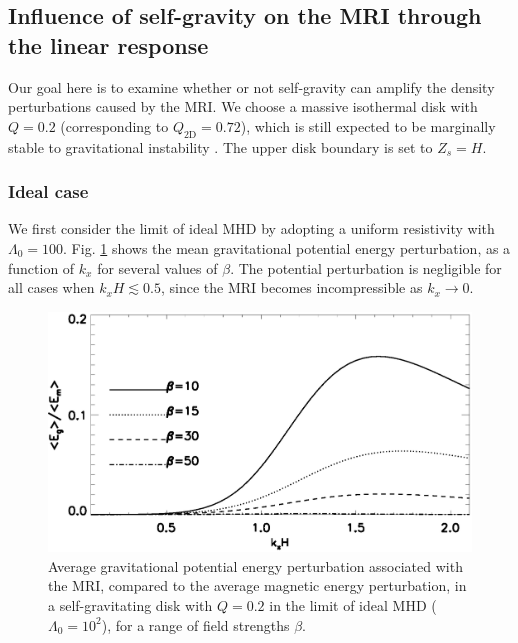 

\subsection{Influence of self-gravity on the MRI through the linear
  response}  
Our goal here is to examine whether or not self-gravity can amplify
the density perturbations caused by the MRI. We choose a massive 
isothermal disk with $Q=0.2$ (corresponding to $Q_\mathrm{2D}=0.72$),
which is still expected to be marginally 
stable to gravitational instability \citep[][who find
a critical value of  $Q\simeq 0.2$]{mamat10}.   
The upper disk boundary is set to $Z_s=H$. 


\subsubsection{Ideal case}
We first consider the limit of ideal MHD by adopting a uniform
resistivity with $\Lambda_0=100$. %
Fig. \ref{gravity_energy} shows the mean gravitational potential
energy perturbation, as a function of $k_x$ for several values of
$\beta$. The potential perturbation is negligible for all cases when 
$k_xH\lesssim 0.5$, since the MRI becomes incompressible as $k_x\to
0$. 

\begin{figure}
  \includegraphics[width=\linewidth]{figures/compare_energy_ideal}
  \caption{Average gravitational potential energy perturbation
    associated with the MRI, compared to the average magnetic energy
    perturbation, in a self-gravitating disk with $Q=0.2$ in 
    the limit of ideal MHD ($\Lambda_0=10^2$), for a range of field
    strengths $\beta$.  
    \label{gravity_energy}}
\end{figure}


